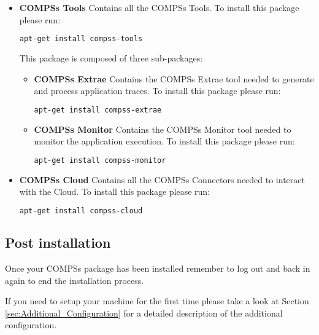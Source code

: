 \begin{itemize}
 \item \textbf{COMPSs Tools} \newline
       Contains all the COMPSs Tools.
       \newline
       To install this package please run:
       \begin{lstlisting}[language=bash]
	  apt-get install compss-tools
       \end{lstlisting}
       This package is composed of three sub-packages:
       \begin{itemize}
        \item \textbf{COMPSs Extrae} \newline
	      Contains the COMPSs Extrae tool needed to generate and process application traces.
	      \newline
	      To install this package please run:
	      \begin{lstlisting}[language=bash]
		  apt-get install compss-extrae
	      \end{lstlisting}
        \item \textbf{COMPSs Monitor} \newline
              Contains the COMPSs Monitor tool needed to monitor the application execution. 
              \newline
	      To install this package please run:
	      \begin{lstlisting}[language=bash]
		  apt-get install compss-monitor
	      \end{lstlisting}
       \end{itemize}

 \item \textbf{COMPSs Cloud} \newline
       Contains all the COMPSs Connectors needed to interact with the Cloud.
       \newline
       To install this package please run:
       \begin{lstlisting}[language=bash]
	  apt-get install compss-cloud
       \end{lstlisting}
\end{itemize} 

\subsection{Post installation}
Once your COMPSs package has been installed remember to log out and back in again to end the installation process.

If you need to setup your machine for the first time please take a look at Section \ref{sec:Additional_Configuration} for a 
detailed description of the additional configuration. 